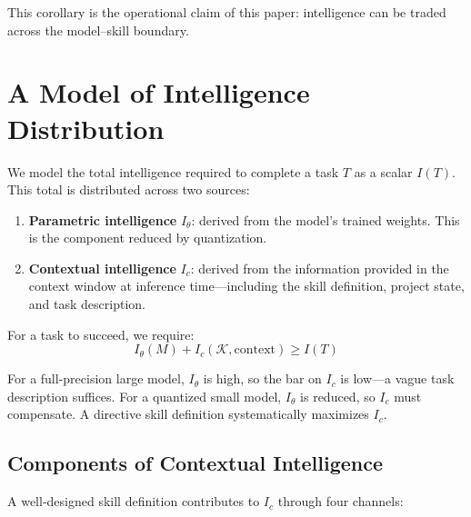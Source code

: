\documentclass[11pt,a4paper]{article}
\begin{document}
This corollary is the operational claim of this paper: intelligence can be
traded across the model--skill boundary.

\section{A Model of Intelligence Distribution}
\label{sec:intelligence-dist}

We model the total intelligence required to complete a task $T$ as a scalar
$I(T)$. This total is distributed across two sources:

\begin{enumerate}
  \item \textbf{Parametric intelligence} $I_\theta$: derived from the model's
  trained weights. This is the component reduced by quantization.
  \item \textbf{Contextual intelligence} $I_c$: derived from the information
  provided in the context window at inference time—including the skill
  definition, project state, and task description.
\end{enumerate}

For a task to succeed, we require:
\[
  I_\theta(M) + I_c(\mathcal{K}, \text{context}) \geq I(T)
\]

For a full-precision large model, $I_\theta$ is high, so the bar on $I_c$ is
low—a vague task description suffices. For a quantized small model,
$I_\theta$ is reduced, so $I_c$ must compensate. A directive skill definition
systematically maximizes $I_c$.

\subsection{Components of Contextual Intelligence}

A well-designed skill definition contributes to $I_c$ through four channels:
\end{document}
